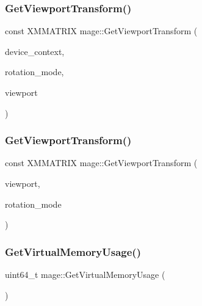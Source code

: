 \hypertarget{namespacemage_a6430737590c5401384e3a65a4f66b240}{}\label{namespacemage_a6430737590c5401384e3a65a4f66b240} 
\subsubsection{\texorpdfstring{Get\+Viewport\+Transform()}{GetViewportTransform()}\hspace{0.1cm}{\footnotesize\ttfamily [2/3]}}
{\footnotesize\ttfamily const X\+M\+M\+A\+T\+R\+IX mage\+::\+Get\+Viewport\+Transform (\begin{DoxyParamCaption}\item[{I\+D3\+D11\+Device\+Context $\ast$}]{device\+\_\+context,  }\item[{D\+X\+G\+I\+\_\+\+M\+O\+D\+E\+\_\+\+R\+O\+T\+A\+T\+I\+ON}]{rotation\+\_\+mode,  }\item[{D3\+D11\+\_\+\+V\+I\+E\+W\+P\+O\+RT $\ast$}]{viewport }\end{DoxyParamCaption})}

\hypertarget{namespacemage_a18ab56ec4969343a6552a73b561ad4ed}{}\label{namespacemage_a18ab56ec4969343a6552a73b561ad4ed} 
\subsubsection{\texorpdfstring{Get\+Viewport\+Transform()}{GetViewportTransform()}\hspace{0.1cm}{\footnotesize\ttfamily [3/3]}}
{\footnotesize\ttfamily const X\+M\+M\+A\+T\+R\+IX mage\+::\+Get\+Viewport\+Transform (\begin{DoxyParamCaption}\item[{const D3\+D11\+\_\+\+V\+I\+E\+W\+P\+O\+RT \&}]{viewport,  }\item[{D\+X\+G\+I\+\_\+\+M\+O\+D\+E\+\_\+\+R\+O\+T\+A\+T\+I\+ON}]{rotation\+\_\+mode }\end{DoxyParamCaption})}

\hypertarget{namespacemage_abc4bbe41e0b34bb80ff8994ec09bd2bf}{}\label{namespacemage_abc4bbe41e0b34bb80ff8994ec09bd2bf} 
\subsubsection{\texorpdfstring{Get\+Virtual\+Memory\+Usage()}{GetVirtualMemoryUsage()}}
{\footnotesize\ttfamily uint64\+\_\+t mage\+::\+Get\+Virtual\+Memory\+Usage (\begin{DoxyParamCaption}{ }\end{DoxyParamCaption})}

